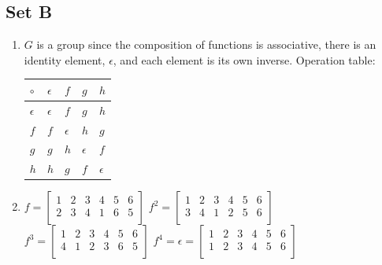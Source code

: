 \documentclass{article}
\begin{document}
\subsection{Set B}

\begin{enumerate}
    \item $G$ is a group since the composition of functions is associative, there is an identity element, $\epsilon$, and each element is its own inverse. Operation table:
    \begin{center}
            \begin{tabular}{l|llll}
            $\circ$       & $\epsilon$ & $f$        & $g$        & $h$           \\\hline
            $\epsilon$    & $\epsilon$ & $f$        & $g$        & $h$           \\
            $f$           & $f$        & $\epsilon$ & $h$        & $g$           \\
            $g$           & $g$        & $h$        & $\epsilon$ & $f$           \\
            $h$           & $h$        & $g$        & $f$        & $\epsilon$
        \end{tabular}
    \end{center}
        
    \item $f = \begin{bmatrix}
        1 & 2 & 3 & 4 & 5 & 6 \\
        2 & 3 & 4 & 1 & 6 & 5 \\
    \end{bmatrix}$\quad
    $f^{2} = \begin{bmatrix}
        1 & 2 & 3 & 4 & 5 & 6 \\
        3 & 4 & 1 & 2 & 5 & 6 \\
    \end{bmatrix}$\quad
    $f^{3} = \begin{bmatrix}
        1 & 2 & 3 & 4 & 5 & 6 \\
        4 & 1 & 2 & 3 & 6 & 5 \\
    \end{bmatrix}$\quad
    $f^{4} = \epsilon = \begin{bmatrix}
        1 & 2 & 3 & 4 & 5 & 6 \\
        1 & 2 & 3 & 4 & 5 & 6 \\
    \end{bmatrix}$


\end{enumerate}
\end{document}
